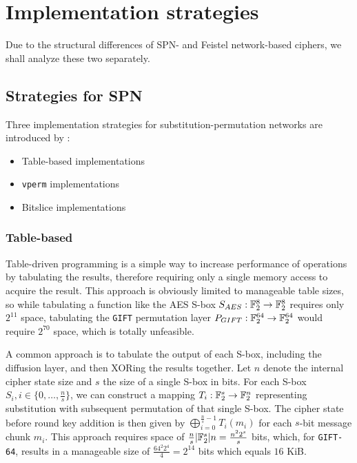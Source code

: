 \chapter{Implementation strategies}

Due to the structural differences of SPN- and Feistel network-based ciphers, we
shall analyze these two separately.

\section{Strategies for SPN}

Three implementation strategies for substitution-permutation networks are
introduced by \cite{implx86:2014}:

\begin{itemize}
    \item Table-based implementations
    \item \texttt{vperm} implementations
    \item Bitslice implementations
\end{itemize}

\subsection{Table-based}

Table-driven programming is a simple way to increase performance of operations
by tabulating the results, therefore requiring only a single memory access to
acquire the result. This approach is obviously limited to manageable table
sizes, so while tabulating a function like the AES S-box
$S_{AES}:\mathbb{F}_2^{8}\rightarrow \mathbb{F}_2^{8}$ requires only $2^{11}$ space,
tabulating the \texttt{GIFT} permutation layer
$P_{GIFT}:\mathbb{F}_2^{64}\rightarrow \mathbb{F}_2^{64}$ would require
$2^{70}$ space, which is totally unfeasible.

A common approach is to tabulate the output of each S-box, including the
diffusion layer, and then XORing the results together. Let $n$ denote the
internal cipher state size and $s$ the size of a single S-box in bits. For each
S-box $S_i,i\in\{0,\dots,\frac{n}{s}\}$, we can construct a mapping
$T_i:\mathbb{F}_2^{s}\rightarrow \mathbb{F}_2^{n}$ representing substitution with subsequent
permutation of that single S-box. The cipher state before round key addition is
then given by $\bigoplus_{i=0}^{\frac{n}{s}-1}{T_i(m_i)}$ for each $s$-bit
message chunk $m_i$. This approach requires space of
$\frac{n}{s}|\mathbb{F}_2^{s}|n=\frac{n^2 2^s}{s}$ bits, which, for \texttt{GIFT-64},
results in a manageable size of $\frac{64^2 2^4}{4}=2^{14}$ bits which equals
$16$ KiB.

